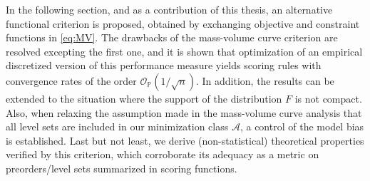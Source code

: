 







In the following section, and as a contribution of this thesis, an alternative functional criterion is proposed, obtained by exchanging objective and constraint functions in \eqref{eq:MV}. The drawbacks of the mass-volume curve criterion are resolved excepting the first one, and it is shown that optimization of an empirical discretized version of this performance measure yields scoring rules with convergence rates of the order $\mathcal{O}_{\mathbb{P}}(1/\sqrt{n})$. In addition, the results can be extended to the situation where the support of the distribution $F$ is not compact. Also, when relaxing the assumption made in the mass-volume curve analysis that all level sets are included in our minimization class $\mathcal{A}$, a control of the model bias is established. Last but not least, we derive (non-statistical) theoretical properties verified by this criterion, which corroborate its adequacy as a metric on preorders/level sets summarized in scoring functions.



